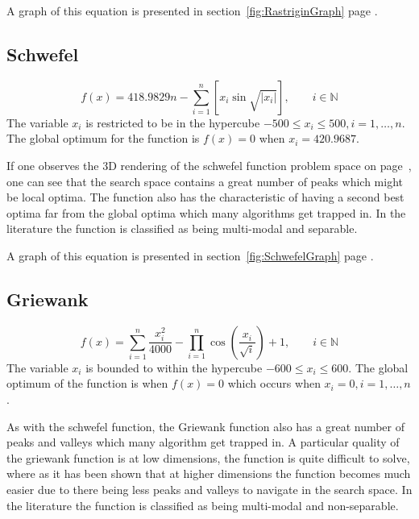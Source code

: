 A graph of this equation is presented in section~\ref{fig:RastriginGraph} page \pageref{fig:RastriginGraph}.
\subsection{Schwefel}
\begin{equation}
	f(x) = 418.9829n - \sum^n_{i=1} [x_i\sin{\sqrt{|x_i|}}], \qquad i \in \mathbb{N}
\end{equation}
The variable $x_i$ is restricted to be in the hypercube $-500 \leq x_i \leq 500, i = 1,\ldots,n$\cite{ABCCompareStudy,numericalABC,HybridIntelliGA,DistributedHierarchicalGA,TestFunctions}. The global optimum for the function is $f(x) = 0$ when $x_i = 420.9687$\cite{ABCCompareStudy,numericalABC,HybridIntelliGA,DistributedHierarchicalGA,TestFunctions}. 

If one observes the 3D rendering of the schwefel function problem space on page~\pageref{fig:SchwefelGraph}, one can see that the search space contains a great number of peaks which might be local optima. The function also has the characteristic of having a second best optima far from the global optima which many algorithms get trapped in\cite{ABCCompareStudy,numericalABC,HybridIntelliGA,DistributedHierarchicalGA,TestFunctions}. In the literature the function is classified as being multi-modal and separable\cite{ABCCompareStudy,numericalABC,HybridIntelliGA,TestFunctions}.

A graph of this equation is presented in section~\ref{fig:SchwefelGraph} page \pageref{fig:SchwefelGraph}.
\subsection{Griewank}
\begin{equation}
	f(x) = \sum^n_{i=1} \frac{x^2_i}{4000} - \prod^n_{i=1}\cos{(\frac{x_i}{\sqrt{i}})} + 1, \qquad i \in \mathbb{N}
\end{equation}
The variable $x_i$ is bounded to within the hypercube $ -600 \leq x_i \leq 600 $\cite{numericalABC,ABCCompareStudy,ARPSO,PerfABC,ContinACSTS,TestFunctions}. The global optimum of the function is when $f(x) =0$ which occurs when $ x_i = 0, i = 1, \dots, n $\cite{numericalABC,ABCCompareStudy,ARPSO,PerfABC,ContinACSTS,TestFunctions}.

As with the schwefel function, the Griewank function also has a great number of peaks and valleys which many algorithm get trapped in. A particular quality of the griewank function is at low dimensions, the function is quite difficult to solve, where as it has been shown that at higher dimensions the function becomes much easier due to there being less peaks and valleys to navigate in the search space\cite{evalevoalgo,ABCCompareStudy,numericalABC,PerfABC,TestFunctions}. In the literature the function is classified as being multi-modal and non-separable\cite{adaptPSO,ABCCompareStudy,numericalABC,ChaoticABC,PerfABC,TestFunctions}.

